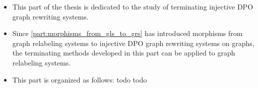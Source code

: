 \begin{itemize}
    \item This part of the thesis is dedicated to the study of terminating injective DPO graph rewriting systems.
    \item Since \autoref{part:morphisms_from_gls_to_grs} has introduced morphisms from graph relabeling systems to injective DPO graph rewriting systems on graphs, the terminating methods developed in this part can be applied to graph relabeling systems.
    \item This part is organized as follows: todo todo 
\end{itemize}